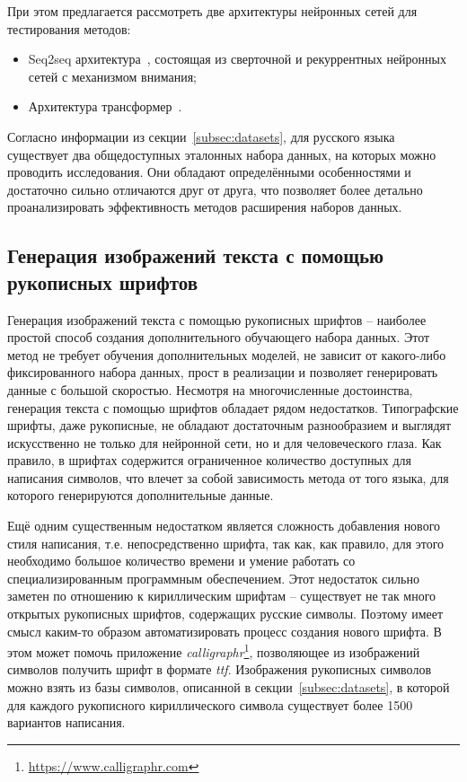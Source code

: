 При этом предлагается рассмотреть две архитектуры нейронных сетей для тестирования методов:
\begin{itemize}
    \item Seq2seq архитектура~\cite{sutskever2014sequence}, состоящая из сверточной и рекуррентных нейронных сетей с механизмом внимания;
    \item Архитектура трансформер~\cite{vaswani2017attention}.
\end{itemize}

Согласно информации из секции~\ref{subsec:datasets}, для русского языка существует два общедоступных эталонных набора данных,
на которых можно проводить исследования.
Они обладают определёнными особенностями и достаточно сильно отличаются друг от друга,
что позволяет более детально проанализировать эффективность методов расширения наборов данных.


\subsection{Генерация изображений текста с помощью рукописных шрифтов}
\label{subsec:synthetic}

Генерация изображений текста с помощью рукописных шрифтов -- наиболее простой способ создания дополнительного обучающего набора данных.
Этот метод не требует обучения дополнительных моделей, не зависит от какого-либо фиксированного набора данных,
прост в реализации и позволяет генерировать данные с большой скоростью.
Несмотря на многочисленные достоинства, генерация текста с помощью шрифтов обладает рядом недостатков.
Типографские шрифты, даже рукописные, не обладают достаточным разнообразием и выглядят искусственно не только для нейронной сети,
но и для человеческого глаза.
Как правило, в шрифтах содержится ограниченное количество доступных для написания символов, что влечет за собой зависимость метода от
того языка, для которого генерируются дополнительные данные.

Ещё одним существенным недостатком является сложность добавления нового стиля написания, т.е. непосредственно шрифта,
так как, как правило, для этого необходимо большое количество времени и умение работать со специализированным программным обеспечением.
Этот недостаток сильно заметен по отношению к кириллическим шрифтам -- существует не так много открытых рукописных шрифтов, содержащих русские символы.
Поэтому имеет смысл каким-то образом автоматизировать процесс создания нового шрифта.
В этом может помочь приложение \textit{calligraphr}\footnote{\url{https://www.calligraphr.com}},
позволяющее из изображений символов получить шрифт в формате \textit{ttf}.
Изображения рукописных символов можно взять из базы символов, описанной в секции~\ref{subsec:datasets},
в которой для каждого рукописного кириллического символа существует более 1500 вариантов написания.


